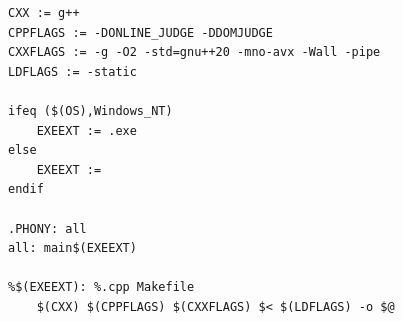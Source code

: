 \begin{verbatim}
CXX := g++
CPPFLAGS := -DONLINE_JUDGE -DDOMJUDGE
CXXFLAGS := -g -O2 -std=gnu++20 -mno-avx -Wall -pipe
LDFLAGS := -static

ifeq ($(OS),Windows_NT)
    EXEEXT := .exe
else
    EXEEXT :=
endif

.PHONY: all
all: main$(EXEEXT)

%$(EXEEXT): %.cpp Makefile
    $(CXX) $(CPPFLAGS) $(CXXFLAGS) $< $(LDFLAGS) -o $@
\end{verbatim}